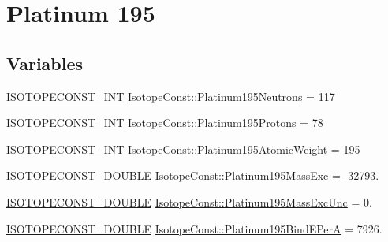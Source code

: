 \hypertarget{group___isotope_const-_platinum-_pt195}{}\section{Platinum 195}
\label{group___isotope_const-_platinum-_pt195}
\subsection*{Variables}
\begin{DoxyCompactItemize}
\item 
\mbox{\hyperlink{group___isotope_const-_macros_ga5f18360b3e99483a35c32d789e62621c}{I\+S\+O\+T\+O\+P\+E\+C\+O\+N\+S\+T\+\_\+\+I\+NT}} \mbox{\hyperlink{group___isotope_const-_platinum-_pt195_ga723221e0c45702ca6dc1129e83b83110}{Isotope\+Const\+::\+Platinum195\+Neutrons}} = 117
\item 
\mbox{\hyperlink{group___isotope_const-_macros_ga5f18360b3e99483a35c32d789e62621c}{I\+S\+O\+T\+O\+P\+E\+C\+O\+N\+S\+T\+\_\+\+I\+NT}} \mbox{\hyperlink{group___isotope_const-_platinum-_pt195_ga3d4873ede182026095f4f5317e694c32}{Isotope\+Const\+::\+Platinum195\+Protons}} = 78
\item 
\mbox{\hyperlink{group___isotope_const-_macros_ga5f18360b3e99483a35c32d789e62621c}{I\+S\+O\+T\+O\+P\+E\+C\+O\+N\+S\+T\+\_\+\+I\+NT}} \mbox{\hyperlink{group___isotope_const-_platinum-_pt195_ga8dbcace83a588cf7d7ce8d606eadb0c7}{Isotope\+Const\+::\+Platinum195\+Atomic\+Weight}} = 195
\item 
\mbox{\hyperlink{group___isotope_const-_macros_ga8f45a7272ce02c0b4c65c44636ed719a}{I\+S\+O\+T\+O\+P\+E\+C\+O\+N\+S\+T\+\_\+\+D\+O\+U\+B\+LE}} \mbox{\hyperlink{group___isotope_const-_platinum-_pt195_ga99b6e18fa6560364a1eeaa501e49087f}{Isotope\+Const\+::\+Platinum195\+Mass\+Exc}} = -\/32793.
\item 
\mbox{\hyperlink{group___isotope_const-_macros_ga8f45a7272ce02c0b4c65c44636ed719a}{I\+S\+O\+T\+O\+P\+E\+C\+O\+N\+S\+T\+\_\+\+D\+O\+U\+B\+LE}} \mbox{\hyperlink{group___isotope_const-_platinum-_pt195_gae7dc73722d11a3cd65afb6a30e556853}{Isotope\+Const\+::\+Platinum195\+Mass\+Exc\+Unc}} = 0.
\item 
\mbox{\hyperlink{group___isotope_const-_macros_ga8f45a7272ce02c0b4c65c44636ed719a}{I\+S\+O\+T\+O\+P\+E\+C\+O\+N\+S\+T\+\_\+\+D\+O\+U\+B\+LE}} \mbox{\hyperlink{group___isotope_const-_platinum-_pt195_ga80c190d4d165616e5d3b9e83280b6175}{Isotope\+Const\+::\+Platinum195\+Bind\+E\+PerA}} = 7926.
\item 

\end{DoxyCompactItemize}

